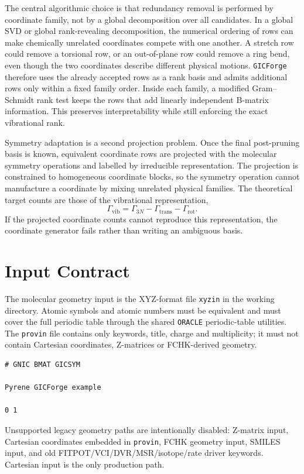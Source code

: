 \documentclass[11pt]{article}
\newcommand{\program}{\texttt{GICForge}}
\newcommand{\oracle}{\texttt{ORACLE}}
\newcommand{\xyzin}{\texttt{xyzin}}
\newcommand{\provin}{\texttt{provin}}
\begin{document}
The central algorithmic choice is that redundancy removal is performed by
coordinate family, not by a global decomposition over all candidates.  In a
global SVD or global rank-revealing decomposition, the numerical ordering of
rows can make chemically unrelated coordinates compete with one another.  A
stretch row could remove a torsional row, or an out-of-plane row could remove a
ring bend, even though the two coordinates describe different physical
motions.  \program{} therefore uses the already accepted rows as a rank basis
and admits additional rows only within a fixed family order.  Inside each
family, a modified Gram--Schmidt rank test keeps the rows that add linearly
independent B-matrix information.  This preserves interpretability while still
enforcing the exact vibrational rank.

Symmetry adaptation is a second projection problem.  Once the final
post-pruning basis is known, equivalent coordinate rows are projected with the
molecular symmetry operations and labelled by irreducible representation.  The
projection is constrained to homogeneous coordinate blocks, so the symmetry
operation cannot manufacture a coordinate by mixing unrelated physical
families.  The theoretical target counts are those of the vibrational
representation,
\[
  \Gamma_\mathrm{vib} = \Gamma_{3N}-\Gamma_\mathrm{trans}-\Gamma_\mathrm{rot}.
\]
If the projected coordinate counts cannot reproduce this representation, the
coordinate generator fails rather than writing an ambiguous basis.

\section{Input Contract}

The molecular geometry input is the XYZ-format file \xyzin{} in the working
directory.  Atomic symbols and atomic numbers must be equivalent and must cover
the full periodic table through the shared \oracle{} periodic-table utilities.
The \provin{} file contains only keywords, title, charge and multiplicity; it
must not contain Cartesian coordinates, Z-matrices or FCHK-derived geometry.

\begin{lstlisting}[style=oracle]
# GNIC BMAT GICSYM

Pyrene GICForge example

0 1
\end{lstlisting}

Unsupported legacy geometry paths are intentionally disabled: Z-matrix input,
Cartesian coordinates embedded in \provin{}, FCHK geometry input, SMILES input,
and old FITPOT/VCI/DVR/MSR/isotope/rate driver keywords.  Cartesian input is the
only production path.
\end{document}

